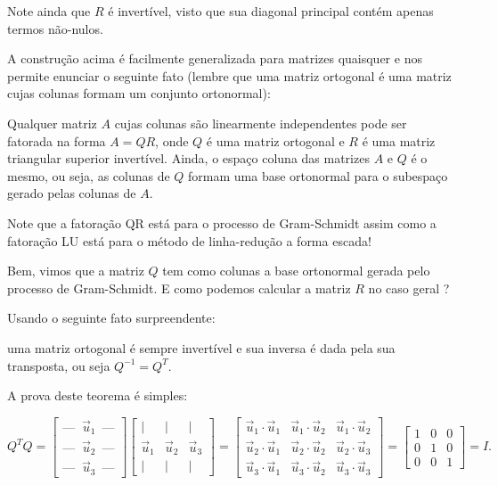 \documentclass[../livro.tex]{subfiles}  %
\begin{document}
Note ainda que $R$ é invertível, visto que sua diagonal principal contém apenas termos não-nulos.

A construção acima é facilmente generalizada para matrizes quaisquer e nos permite enunciar o seguinte fato
(lembre que uma matriz ortogonal é uma matriz cujas colunas formam um conjunto ortonormal):

\begin{theorem}
Qualquer matriz $A$ cujas colunas são linearmente independentes pode ser fatorada na forma $A=QR$, onde $Q$ é uma matriz ortogonal 
e $R$ é uma matriz triangular superior invertível. Ainda, o espaço coluna das matrizes $A$ e $Q$ é o mesmo, ou seja, as colunas de $Q$ formam uma base ortonormal para o subespaço gerado pelas colunas de $A$.
\end{theorem} 

Note que a fatoração QR está para o processo de Gram-Schmidt assim como a fatoração LU está para o método de  linha-redução a forma escada!  %

Bem, vimos que a matriz $Q$ tem como colunas a base ortonormal gerada pelo processo de Gram-Schmidt. E como podemos calcular a matriz $R$ no caso geral ? 

Usando o seguinte fato surpreendente: 

\begin{theorem}
uma matriz ortogonal é sempre invertível e sua inversa é dada pela sua transposta, ou seja $Q^{-1}= Q^T$.
\end{theorem}


A prova deste teorema é simples:
 
\begin{equation}
Q^T Q =
\begin{bmatrix}
 \text{--- }\  \vec{u}_1 \, \text{ ---} \\
 \text{--- }\  \vec{u}_2 \, \text{ ---} \\
 \text{--- }\  \vec{u}_3 \, \text{ ---}
\end{bmatrix}
\begin{bmatrix}
 | & | & | \\
\vec{u}_1 & \vec{u}_2 & \vec{u}_3 \\
 | & | & |
\end{bmatrix} =
\begin{bmatrix}
 \vec{u}_1 \cdot \vec{u}_1 & \vec{u}_1 \cdot \vec{u}_2 & \vec{u}_1 \cdot \vec{u}_2 \\
 \vec{u}_2 \cdot \vec{u}_1 & \vec{u}_2 \cdot \vec{u}_2 & \vec{u}_2 \cdot \vec{u}_3 \\
 \vec{u}_3 \cdot \vec{u}_1 & \vec{u}_3 \cdot \vec{u}_2 & \vec{u}_3 \cdot \vec{u}_3
\end{bmatrix} =
\begin{bmatrix}
1 & 0 & 0 \\
0 & 1 & 0 \\
0 & 0 & 1
\end{bmatrix} = I.
\end{equation}
\end{document}
